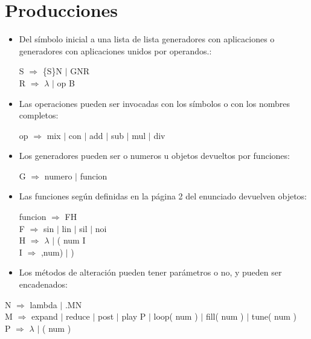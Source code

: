 \documentclass[a4paper]{article}
\begin{document}
\section{Producciones}
\begin{itemize}
\item Del símbolo inicial a una lista de lista generadores con aplicaciones o generadores con aplicaciones unidos por operandos.:
\begin{center}
S $\Rightarrow$ \{S\}N $|$ GNR \\
R $\Rightarrow$ $\lambda$ $|$ op B 
\end{center}

\item Las operaciones pueden ser invocadas con los símbolos o con los nombres completos:
\begin{center}
op $\Rightarrow$ mix $|$ con $|$ add $|$ sub $|$ mul $|$ div \\ 
\end{center}

\item Los generadores pueden ser o numeros u objetos devueltos por funciones:
\begin{center}
G $\Rightarrow$ numero $|$ funcion \\ 
\end{center}

\item Las funciones según definidas en la página 2 del enunciado devuelven objetos:
\begin{center}
funcion $\Rightarrow$  FH \\
F $\Rightarrow$ sin $|$ lin $|$ sil $|$ noi \\
H $\Rightarrow$ $\lambda$ $|$ ( num I \\
I $\Rightarrow$ ,num) $|$ ) \\
\end{center}

\item Los métodos de alteración pueden tener parámetros o no, y pueden ser encadenados:
\end{itemize}
\begin{center}
N $\Rightarrow$ lambda $|$ .MN \\
M $\Rightarrow$ expand $|$ reduce $|$ post $|$ play P $|$ loop( num ) $|$ fill( num ) $|$ tune( num ) \\
P $\Rightarrow$ $\lambda$ $|$ ( num ) \\
\end{center}
\end{document}
